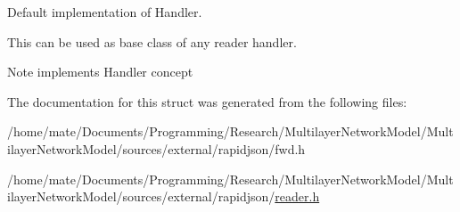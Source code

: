 Default implementation of Handler. 

This can be used as base class of any reader handler. \begin{DoxyNote}{Note}
implements Handler concept 
\end{DoxyNote}


The documentation for this struct was generated from the following files\+:\begin{DoxyCompactItemize}
\item 
/home/mate/\+Documents/\+Programming/\+Research/\+Multilayer\+Network\+Model/\+Multilayer\+Network\+Model/sources/external/rapidjson/fwd.\+h\item 
/home/mate/\+Documents/\+Programming/\+Research/\+Multilayer\+Network\+Model/\+Multilayer\+Network\+Model/sources/external/rapidjson/\hyperlink{reader_8h}{reader.\+h}\end{DoxyCompactItemize}
